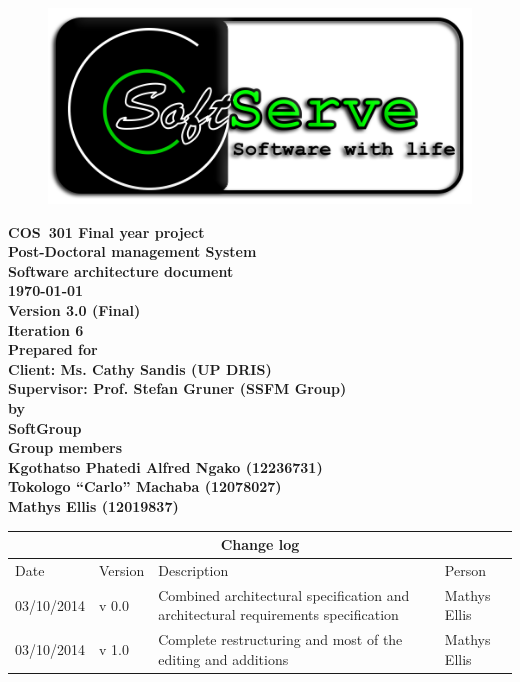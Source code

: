 \documentclass[12pt]{article}
\newcommand{\Title}{Software architecture document} %
\newcommand{\Class}{COS\ 301 Final year project} %
\newcommand{\ssr}{Soft\color{green}{Serve }\color{black}}
\newcommand{\version}{3.0 (Final)}
\newcommand{\iteration}{6}
\newcommand{\client}{Ms. Cathy Sandis (UP DRIS)}
\newcommand{\supervisor}{Prof. Stefan Gruner (SSFM Group)}
\newcommand{\project}{Post-Doctoral management System}
\begin{document}
\vspace{4em}

\begin{center}%

\begin{figure}[ht!]
\centering
\includegraphics{../Images_Docs/logo.png}
\end{figure}
\LARGE \bf \Class \\[0.25em]
\LARGE \bf \project \\[1em]
\LARGE \bf \Title \\[0.25em]
\large \bf \today\\
\bf Version \version\\
\bf Iteration \iteration\\[0.5em]
\Large \bf Prepared for \\Client: \client\\Supervisor: \supervisor
\Large \\\bf by \\
\Large {\bf \ssr Group }\\[0.5em]
\LARGE {\bf Group members}\\[0.25em]
\large
Kgothatso Phatedi Alfred Ngako (12236731) \\[0.5em]
Tokologo “Carlo” Machaba (12078027) \\[0.5em]
Mathys Ellis (12019837) \\[8em]

\end{center}%


\begin{center}
\begin{tabular}{|l|p{1.4cm}|p{8cm}|p{2.8cm}|}
\hline
\multicolumn{4}{|c|}{\bf Change log} \\
\hline
 Date & Version & Description &  Person \\
\hline
03/10/2014 & v 0.0 & Combined architectural specification and architectural requirements specification & Mathys Ellis \\
\hline
03/10/2014 & v 1.0 & Complete restructuring and most of the editing and additions  & Mathys Ellis \\
\hline

\end{tabular}
\end{center}
\newpage
\tableofcontents
\end{document}
